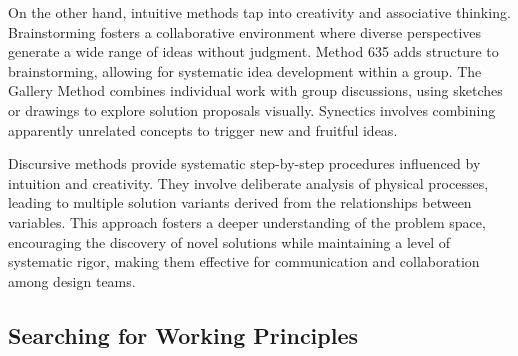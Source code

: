 On the other hand, intuitive methods tap into creativity and associative thinking. Brainstorming fosters a collaborative environment where diverse perspectives generate a wide range of ideas without judgment. Method 635 adds structure to brainstorming, allowing for systematic idea development within a group. The Gallery Method combines individual work with group discussions, using sketches or drawings to explore solution proposals visually. Synectics involves combining apparently unrelated concepts to trigger new and fruitful ideas. \cite{Pahl07h}

Discursive methods provide systematic step-by-step procedures influenced by intuition and creativity. They involve deliberate analysis of physical processes, leading to multiple solution variants derived from the relationships between variables. This approach fosters a deeper understanding of the problem space, encouraging the discovery of novel solutions while maintaining a level of systematic rigor, making them effective for communication and collaboration among design teams. \cite{Pahl07i}

\subsection{Searching for Working Principles}

